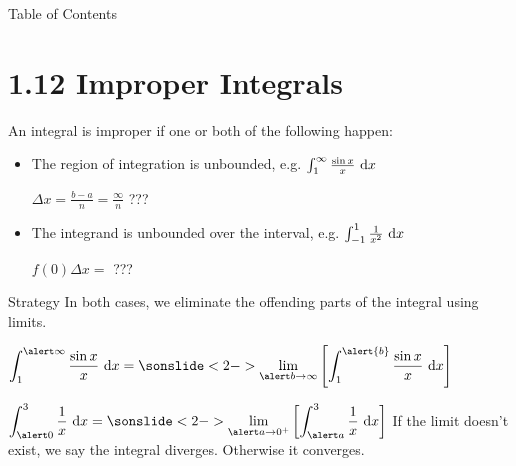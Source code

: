 

 \begin{frame}{Table of Contents }
\mapofcontentsA{\al,\atool}
 \end{frame}

\section{1.12  Improper Integrals}
\begin{frame}
An integral is \alert{improper} if one or both of the following happen:
\begin{itemize}
	\item The region of integration is unbounded, e.g. $\int_1^\infty \frac{\sin x}{x} \ \text{d} x$\\
	\pause $\Delta x = \frac{b-a}{n}=\frac{\infty}{n}$ ???\pause\hfill
	\item The integrand is unbounded over the interval, e.g. $\int_{-1}^1\frac1{x^2} \ \text{d} x$
	\pause\hfill $f(0)\Delta x=$  ???
	\end{itemize}
\end{frame}
\begin{frame}\begin{block}{Strategy}
In both cases, we eliminate the offending parts of the integral using limits.\end{block}\vfill

$\displaystyle\int_1^{\alert\infty} \frac{\sin x}{x}\ \dee x = \sonslide<2->{\lim_{\alert b \to \infty}\left[\int_1^{\alert{b}} \frac{\sin x}{x}\ \dee x\right]}$
\vfill

$\displaystyle\int_{\alert0}^3 \frac1x\ \dee x = \sonslide<2->{\lim_{\alert a\to 0^+}\left[\int_{\alert a}^3\frac1x\ \dee x\right]}$
\vfill
If the limit doesn't exist, we say the integral \alert{diverges}. Otherwise it \alert{converges}.
\end{frame}

